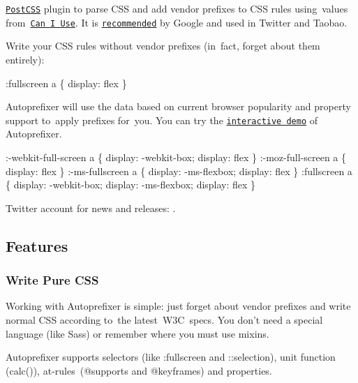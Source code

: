 

\href{https://github.com/postcss/postcss}{\tt Post\+C\+SS} plugin to parse C\+SS and add vendor prefixes to C\+SS rules using values from \href{http://caniuse.com/}{\tt Can I Use}. It is \href{https://developers.google.com/web/tools/setup/setup-buildtools#dont-trip-up-with-vendor-prefixes}{\tt recommended} by Google and used in Twitter and Taobao.

Write your C\+SS rules without vendor prefixes (in fact, forget about them entirely)\+:


\begin{DoxyCode}
:fullscreen a \{
    display: flex
\}
\end{DoxyCode}


Autoprefixer will use the data based on current browser popularity and property support to apply prefixes for you. You can try the \href{http://autoprefixer.github.io/}{\tt interactive demo} of Autoprefixer.


\begin{DoxyCode}
:-webkit-full-screen a \{
    display: -webkit-box;
    display: flex
\}
:-moz-full-screen a \{
    display: flex
\}
:-ms-fullscreen a \{
    display: -ms-flexbox;
    display: flex
\}
:fullscreen a \{
    display: -webkit-box;
    display: -ms-flexbox;
    display: flex
\}
\end{DoxyCode}


Twitter account for news and releases\+: \href{https://twitter.com/autoprefixer}{\tt }.

\href{https://evilmartians.com/?utm_source=autoprefixer}{\tt }

\subsection*{Features}

\subsubsection*{Write Pure C\+SS}

Working with Autoprefixer is simple\+: just forget about vendor prefixes and write normal C\+SS according to the latest \+W3\+C specs. You don’t need a special language (like Sass) or remember where you must use mixins.

Autoprefixer supports selectors (like {\ttfamily \+:fullscreen} and {\ttfamily \+::selection}), unit function ({\ttfamily calc()}), at‑rules ({\ttfamily @supports} and {\ttfamily @keyframes}) and properties.

